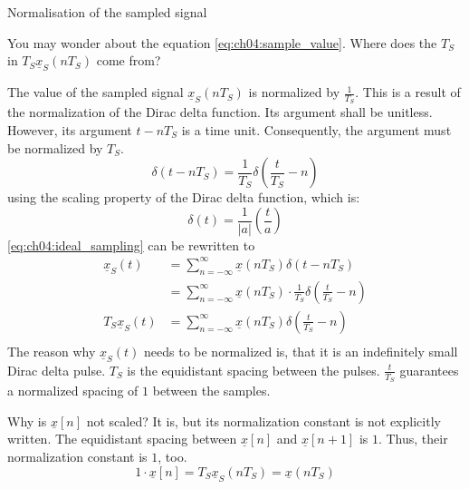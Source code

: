 \begin{refsection}
\begin{excursus}{Normalisation of the sampled signal}
	\label{ref:ch04:normalization_xs}
	
	You may wonder about the equation \eqref{eq:ch04:sample_value}. Where does the $T_S$ in $T_S \underline{x}_S\left(n T_S\right)$ come from?
	
	\vspace{0.5em}
	
	The value of the sampled signal $\underline{x}_S\left(n T_S\right)$ is normalized by $\frac{1}{T_S}$. This is a result of the normalization of the Dirac delta function. Its argument shall be unitless. However, its argument $t - n T_S$ is a time unit. Consequently, the argument must be normalized by $T_S$.
	\begin{equation}
		\delta\left(t - n T_S\right) = \frac{1}{T_S} \delta\left(\frac{t}{T_S} - n\right)
	\end{equation}
	using the scaling property of the Dirac delta function, which is:
	\begin{equation}
		\delta\left(t\right) = \frac{1}{|a|} \left(\frac{t}{a}\right)
	\end{equation}
	\eqref{eq:ch04:ideal_sampling} can be rewritten to
	\begin{equation}
		\begin{split}
			\underline{x}_S(t) &= \sum\limits_{n = -\infty}^{\infty} \underline{x}\left(n T_S\right) \delta\left(t - n T_S\right) \\
			 &= \sum\limits_{n = -\infty}^{\infty} \underline{x}\left(n T_S\right) \cdot \frac{1}{T_S} \delta\left(\frac{t}{T_S} - n\right) \\
			T_S \underline{x}_S(t) &= \sum\limits_{n = -\infty}^{\infty} \underline{x}\left(n T_S\right) \delta\left(\frac{t}{T_S} - n\right) \\
		\end{split}
	\end{equation}
	The reason why $\underline{x}_S(t)$ needs to be normalized is, that it is an indefinitely small Dirac delta pulse. $T_S$ is the equidistant spacing between the pulses. $\frac{t}{T_S}$ guarantees a normalized spacing of $1$ between the samples.
	
	\vspace{0.5em}
	
	Why is $\underline{x}[n]$ not scaled? It is, but its normalization constant is not explicitly written. The equidistant spacing between $\underline{x}[n]$ and $\underline{x}[n+1]$ is $1$. Thus, their normalization constant is $1$, too.
	\begin{equation*}
		1 \cdot \underline{x}[n] = T_S \underline{x}_S\left(n T_S\right) = \underline{x}\left(n T_S\right)
	\end{equation*}
\end{excursus}


\end{refsection}
